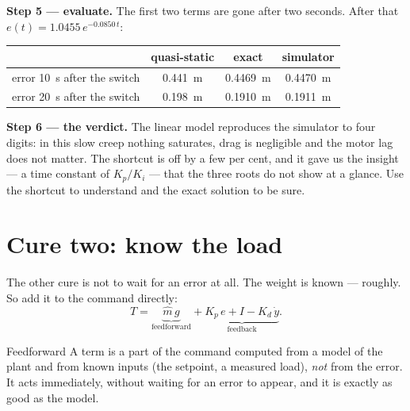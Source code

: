 \begin{example}
\textbf{Step 5 — evaluate.} The first two terms are gone after two seconds. After that $e(t) = 1.0455\,e^{-0.0850\,t}$:
\begin{center}\small
\begin{tabular}{lccc}
\toprule
 & quasi-static & exact & simulator\\
\midrule
error \SI{10}{s} after the switch & \SI{0.441}{m} & \SI{0.4469}{m} & \SI{0.4470}{m}\\
error \SI{20}{s} after the switch & \SI{0.198}{m} & \SI{0.1910}{m} & \SI{0.1911}{m}\\
\bottomrule
\end{tabular}
\end{center}

\textbf{Step 6 — the verdict.} The linear model reproduces the simulator to four digits: in this slow creep nothing saturates, drag is negligible and the motor lag does not matter. The shortcut is off by a few per cent, and it gave us the insight — a time constant of $K_p/K_i$ — that the three roots do not show at a glance. Use the shortcut to understand and the exact solution to be sure.
\end{example}


\section{Cure two: know the load}

The other cure is not to wait for an error at all. The weight is known — roughly. So add it to the command directly:
\begin{equation}\label{eq:droop-ff}
  T = \underbrace{\hat m\,g}_{\text{feedforward}} + \underbrace{K_p\,e + I - K_d\,\dot y}_{\text{feedback}} .
\end{equation}

\begin{definition}{Feedforward}
A  term is a part of the command computed from a model of the plant and from known inputs (the setpoint, a measured load), \emph{not} from the error. It acts immediately, without waiting for an error to appear, and it is exactly as good as the model.
\end{definition}

